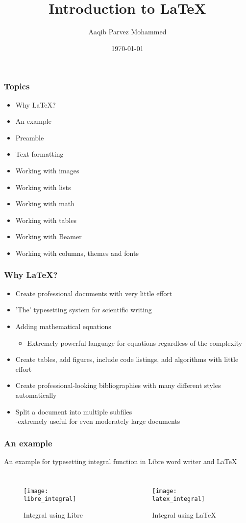 \documentclass{beamer}
\title{Introduction to LaTeX}
\author{Aaqib Parvez Mohammed}
\date{\today}
\begin{document}
\maketitle
\begin{frame}
\frametitle{Topics}
\begin{itemize}
\item Why LaTeX?
\item An example
\item Preamble
\item Text formatting
\item Working with images
\item Working with lists
\item Working with math
\item Working with tables
\item Working with Beamer
\item Working with columns, themes and fonts
\end{itemize}
\end{frame}
\begin{frame}
\frametitle{Why LaTeX?}
\begin{itemize}
\item Create professional documents with very little effort
\item 'The' typesetting system for scientific writing
\item Adding mathematical equations
\begin{itemize}
\item Extremely powerful language for equations regardless of the complexity
\end{itemize}
\item Create tables, add figures, include code listings, add algorithms with little effort
\item Create professional-looking bibliographies with many different styles automatically
\item Split a document into multiple subfiles \\-extremely useful for even moderately large documents
\end{itemize}
\end{frame}
\begin{frame}
\frametitle{An example}
An example for typesetting integral function in Libre word writer and LaTeX
\begin{columns}
\begin{figure}
\texttt{[image: libre\_integral]}
\caption{Integral using Libre}
\end{figure}
\begin{figure}
\texttt{[image: latex\_integral]}
\caption{Integral using LaTeX}
\end{figure}
\end{columns}
\end{frame}
\end{document}
